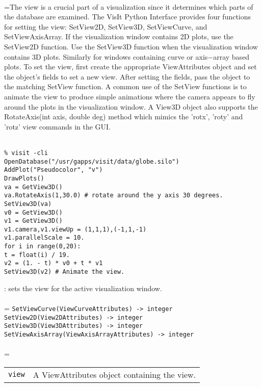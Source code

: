 \documentclass[10pt,a4paper]{report}
\begin{document}
 \\ 
\hangindent=\parindent The view is a crucial part of a visualization since it determines which parts of the database are examined. The VisIt Python Interface provides four functions for setting the view: SetView2D, SetView3D, SetViewCurve, and SetViewAxisArray. If the visualization window contains 2D plots, use the SetView2D function. Use the SetView3D function when the visualization window contains 3D plots.  Similarly for windows containing curve or axis$-$array based plots.  To set the view, first create the appropriate ViewAttributes object and set the object's fields to set a new view. After setting the fields, pass the object to the matching SetView function. A common use of the SetView functions is to animate the view to produce simple animations where the camera appears to fly around the plots in the visualization window. A View3D object also supports the RotateAxis(int axis, double deg) method which mimics the 'rotx', 'roty' and 'rotz' view commands in the GUI. \\[-3mm] 

\\[-6mm]
\begin{verbatim}% visit -cli
OpenDatabase("/usr/gapps/visit/data/globe.silo")
AddPlot("Pseudocolor", "v")
DrawPlots()
va = GetView3D()
va.RotateAxis(1,30.0) # rotate around the y axis 30 degrees.
SetView3D(va)
v0 = GetView3D()
v1 = GetView3D()
v1.camera,v1.viewUp = (1,1,1),(-1,1,-1)
v1.parallelScale = 10.
for i in range(0,20):
t = float(i) / 19.
v2 = (1. - t) * v0 + t * v1
SetView3D(v2) # Animate the view.
\end{verbatim}
\newpage


{}
: sets the view for the active visualization window.\\[-3mm]

 \\ 
\hangindent=\parindent 
\verb!SetViewCurve(ViewCurveAttributes) -> integer!\\ 
\verb!SetView2D(View2DAttributes) -> integer!\\ 
\verb!SetView3D(View3DAttributes) -> integer!\\ 
\verb!SetViewAxisArray(ViewAxisArrayAttributes) -> integer!\\ [-3mm]

 \\ 
\hangindent=\parindent 
\begin{tabular}{lp{9cm}}
\verb!view! & A ViewAttributes object containing the view. \\
\end{tabular} \\[-2mm]
\end{document}
